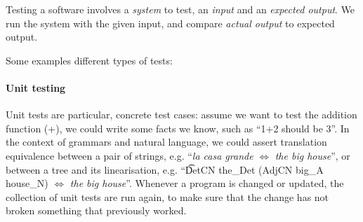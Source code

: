


Testing a software involves a \emph{system} to test, an \emph{input}
and an \emph{expected output}. We run the system with the given
input, and compare \emph{actual output} to expected output.

Some examples different types of tests:

\paragraph{Unit testing}

Unit tests are particular, concrete test cases: assume we want to test the
addition function (+), we could write some facts we know, such as
``1+2 should be 3''. In the context of grammars and natural language,
we could assert translation equivalence between a pair of strings,
e.g. ``\emph{la casa grande} $\Leftrightarrow$ \emph{the big house}'',
or between a tree and its linearisation, e.g. ``\t{DetCN the\_Det
  (AdjCN  big\_A house\_N)} $\Leftrightarrow$ \emph{the big house}''.
Whenever a program is changed or updated, the collection of unit tests
are run again, to make sure that the change has not broken something
that previously worked.

